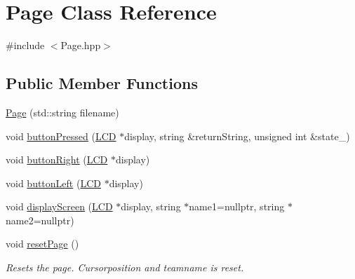 \hypertarget{class_page}{}\section{Page Class Reference}
\label{class_page}


{\ttfamily \#include $<$Page.\+hpp$>$}

\subsection*{Public Member Functions}
\begin{DoxyCompactItemize}
\item 
\hyperlink{class_page_a8348344aff8c2ec7e7f1d52edf2eb99f}{Page} (std\+::string filename)
\item 
void \hyperlink{class_page_a8c7dd5910785a3a69e0644a3159ecf12}{button\+Pressed} (\hyperlink{class_l_c_d}{L\+CD} $\ast$display, string \&return\+String, unsigned int \&state\+\_\+)
\item 
void \hyperlink{class_page_aea5c5dd94cfbb77072150c60a59b6589}{button\+Right} (\hyperlink{class_l_c_d}{L\+CD} $\ast$display)
\item 
void \hyperlink{class_page_a741e3788b484622f2426a9f0134e34c9}{button\+Left} (\hyperlink{class_l_c_d}{L\+CD} $\ast$display)
\item 
void \hyperlink{class_page_ae49da6fc746a1c10c4d208d717b6da31}{display\+Screen} (\hyperlink{class_l_c_d}{L\+CD} $\ast$display, string $\ast$name1=nullptr, string $\ast$name2=nullptr)
\item 
void \hyperlink{class_page_accc9eda24cc6ccd4133fd8dd59202144}{reset\+Page} ()
\begin{DoxyCompactList}\small\item\em Resets the page. Cursorposition and teamname is reset. \end{DoxyCompactList}\end{DoxyCompactItemize}
